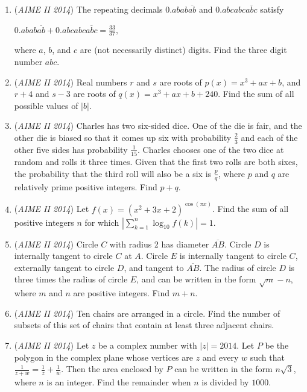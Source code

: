 \begin{enumerate}
	\item (\textit{AIME II 2014}) The repeating decimals $0.abab\overline{ab}$ and $0.abcabc\overline{abc}$ satisfy 


 $0.abab\overline{ab}+0.abcabc\overline{abc}=\frac{33}{37},$


 where $a$, $b$, and $c$ are (not necessarily distinct) digits. Find the three digit number $abc$. 


 

	\item (\textit{AIME II 2014}) Real numbers $r$ and $s$ are roots of $p(x)=x^3+ax+b$, and $r+4$ and $s-3$ are roots of $q(x)=x^3+ax+b+240$. Find the sum of all possible values of $|b|$.


 

	\item (\textit{AIME II 2014}) Charles has two six-sided dice. One of the die is fair, and the other die is biased so that it comes up six with probability $\frac{2}{3}$ and each of the other five sides has probability $\frac{1}{15}$. Charles chooses one of the two dice at random and rolls it three times. Given that the first two rolls are both sixes, the probability that the third roll will also be a six is $\frac{p}{q}$, where $p$ and $q$ are relatively prime positive integers. Find $p+q$. 


 

	\item (\textit{AIME II 2014}) Let $f(x)=(x^2+3x+2)^{\cos(\pi x)}$. Find the sum of all positive integers $n$ for which 
$\left |\sum_{k=1}^n\log_{10}f(k)\right|=1.$


	\item (\textit{AIME II 2014}) Circle $C$ with radius 2 has diameter $\overline{AB}$. Circle $D$ is internally tangent to circle $C$ at $A$. Circle $E$ is internally tangent to circle $C$, externally tangent to circle $D$, and tangent to $\overline{AB}$. The radius of circle $D$ is three times the radius of circle $E$, and can be written in the form $\sqrt{m}-n$, where $m$ and $n$ are positive integers. Find $m+n$.


 

	\item (\textit{AIME II 2014}) Ten chairs are arranged in a circle. Find the number of subsets of this set of chairs that contain at least three adjacent chairs.


 

	\item (\textit{AIME II 2014}) Let $z$ be a complex number with $|z|=2014$. Let $P$ be the polygon in the complex plane whose vertices are $z$ and every $w$ such that $\frac{1}{z+w}=\frac{1}{z}+\frac{1}{w}$. Then the area enclosed by $P$ can be written in the form $n\sqrt{3}$, where $n$ is an integer. Find the remainder when $n$ is divided by $1000$. 



\end{enumerate}
